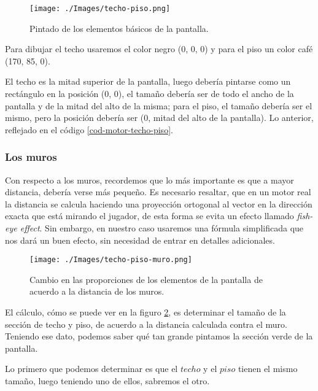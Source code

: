 \begin{figure}[h!]
	\centering
	\texttt{[image: ./Images/techo-piso.png]}
	\caption{Pintado de los elementos básicos de la pantalla.}
	\label{techo-piso}
\end{figure}

Para dibujar el techo usaremos el color negro (0, 0, 0) y para el piso un color café (170, 85, 0). 

El techo es la mitad superior de la pantalla, luego debería pintarse como un rectángulo en la posición (0, 0), el tamaño debería ser de todo el ancho de la pantalla y de la mitad del alto de la misma; para el piso, el tamaño debería ser el mismo, pero la posición debería ser (0, mitad del alto de la pantalla). Lo anterior, reflejado en el código \ref{cod-motor-techo-piso}.

\newpage



\subsubsection{Los muros}

Con respecto a los muros, recordemos que lo más importante es que a mayor distancia, debería verse más pequeño. Es necesario resaltar, que en un motor real la distancia se calcula haciendo una proyección ortogonal al vector en la dirección exacta que está mirando el jugador, de esta forma se evita un efecto llamado \emph{fish-eye effect}. Sin embargo, en nuestro caso usaremos una fórmula simplificada que nos dará un buen efecto, sin necesidad de entrar en detalles adicionales.

\begin{figure}[h!]
	\centering
	\texttt{[image: ./Images/techo-piso-muro.png]}
	\caption{Cambio en las proporciones de los elementos de la pantalla de acuerdo a la distancia de los muros.}
	\label{techo-piso-muro}
\end{figure}

El cálculo, cómo se puede ver en la figuro \ref{techo-piso-muro}, es determinar el tamaño de la sección de techo y piso, de acuerdo a la distancia calculada contra el muro. Teniendo ese dato, podemos saber qué tan grande pintamos la sección verde de la pantalla.

Lo primero que podemos determinar es que el $techo$ y el $piso$ tienen el mismo tamaño, luego teniendo uno de ellos, sabremos el otro.

